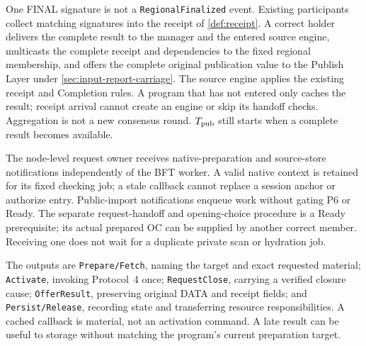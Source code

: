 \documentclass[11pt,a4paper]{article}
\begin{document}
One FINAL signature is not a \texttt{RegionalFinalized} event. Existing
participants collect matching signatures into the receipt of
\cref{def:receipt}. A correct holder delivers the complete result to
the manager and the entered source engine, multicasts the complete
receipt and dependencies to the fixed regional membership, and offers
the complete original publication value to the Publish Layer under
\cref{sec:input-report-carriage}. The source engine applies the existing receipt and Completion
rules. A program that has not entered only caches the result; receipt
arrival cannot create an engine or skip its handoff checks. Aggregation
is not a new consensus round. $T_{\rm pub}$ still starts when a complete
result becomes available.

The node-level request owner receives native-preparation and source-store
notifications independently of the BFT worker. A valid native context
is retained for its fixed checking job; a stale callback cannot replace
a session anchor or authorize entry. Public-import notifications enqueue
work without gating P6 or Ready. The separate request-handoff and
opening-choice procedure is a Ready prerequisite; its actual prepared
OC can be supplied by another correct member. Receiving one does not
wait for a duplicate private scan or hydration job.

The outputs are \texttt{Prepare/Fetch}, naming the target and exact
requested material; \texttt{Activate}, invoking Protocol~4 once;
\texttt{RequestClose}, carrying a verified closure cause;
\texttt{OfferResult}, preserving original DATA and receipt fields;
and \texttt{Persist/Release}, recording state and transferring resource
responsibilities. A cached callback is material, not an activation
command. A late result can be useful to storage without matching the
program's current preparation target.


\end{document}
